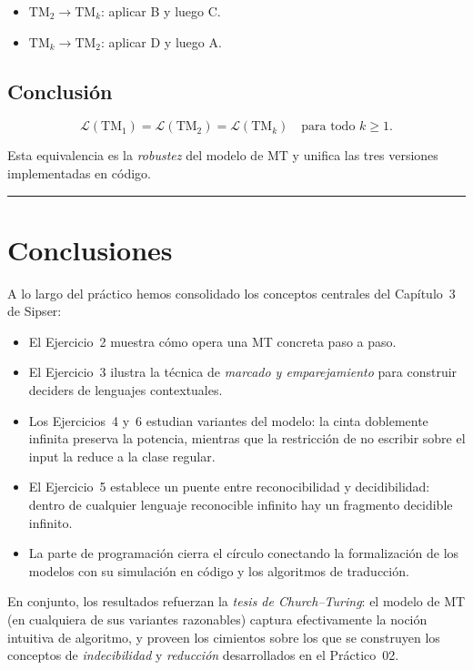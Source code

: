 \documentclass[11pt,a4paper]{article}
\theoremstyle{plain}
\theoremstyle{definition}
\theoremstyle{remark}
\newcommand{\TM}{\mathrm{TM}}
\newcommand{\TMtwo}{\TM_{2}}
\newcommand{\TMone}{\TM_{1}}
\newcommand{\TMk}{\TM_{k}}
\begin{document}
\begin{itemize}
  \item $\TMtwo\to\TMk$: aplicar B y luego C.
  \item $\TMk\to\TMtwo$: aplicar D y luego A.
\end{itemize}

\subsection*{Conclusi\'on}

\[
  \mathcal L(\TMone) = \mathcal L(\TMtwo) = \mathcal L(\TMk)
  \quad\text{para todo } k\ge 1.
\]

Esta equivalencia es la \emph{robustez} del modelo de MT y unifica las tres
versiones implementadas en c\'odigo.

\bigskip\hrule\bigskip

\section*{Conclusiones}

A lo largo del pr\'actico hemos consolidado los conceptos centrales del
Cap\'itulo~3 de Sipser:

\begin{itemize}
  \item El Ejercicio~2 muestra c\'omo opera una MT concreta paso a paso.
  \item El Ejercicio~3 ilustra la t\'ecnica de \emph{marcado y emparejamiento}
        para construir deciders de lenguajes contextuales.
  \item Los Ejercicios~4 y~6 estudian variantes del modelo: la cinta
        doblemente infinita preserva la potencia, mientras que la
        restricci\'on de no escribir sobre el input la reduce a la clase
        regular.
  \item El Ejercicio~5 establece un puente entre reconocibilidad y
        decidibilidad: dentro de cualquier lenguaje reconocible infinito hay
        un fragmento decidible infinito.
  \item La parte de programaci\'on cierra el c\'irculo conectando la
        formalizaci\'on de los modelos con su simulaci\'on en c\'odigo y los
        algoritmos de traducci\'on.
\end{itemize}

En conjunto, los resultados refuerzan la \emph{tesis de Church--Turing}: el
modelo de MT (en cualquiera de sus variantes razonables) captura
efectivamente la noci\'on intuitiva de algoritmo, y proveen los cimientos
sobre los que se construyen los conceptos de \emph{indecibilidad} y
\emph{reducci\'on} desarrollados en el Pr\'actico~02.
\end{document}
